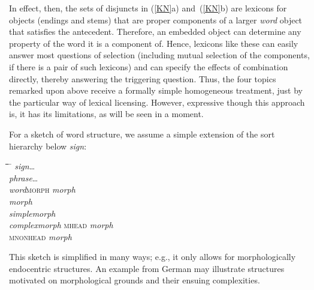 \documentclass[output=paper]{langsci/langscibook}
\begin{document}
In effect, then, the sets of disjuncts in (\ref{KN}a) and~(\ref{KN}b) are
lexicons for objects (endings and stems) that are proper components of a
larger \textit{word}\/ object that satisfies the antecedent. Therefore, an
embedded object can determine any property of the word it is a component
of. Hence, lexicons like these can easily answer most questions of
selection (including mutual selection of the components, if there is a pair
of such lexicons) and can specify the effects of combination directly,
thereby answering the triggering question. Thus, the four topics remarked
upon above receive a formally simple homogeneous treatment, just by the
particular way of lexical licensing.  
However, expressive though this
approach is, it has its limitations, as will be seen in a moment.

For a sketch of word structure, we assume a simple extension of the sort
hierarchy below \textit{sign}\/:
%
\begin{exe}
\ex
\label{mstruc}
\begin{tabbing}
\hspace{1,5em}\=\hspace{1,5em}\=\hspace{1,5em}\=\hspace{1,5em}\=\hspace{6em}
\=\kill
\textit{sign}\>\>\>\>\>\ldots\\
\>\textit{phrase}\>\>\>\>\ldots\\
\>\textit{word}\>\>\>\>\textsc{morph} \textit{morph}\\
\>\textit{morph}\\
\>\>\textit{simplemorph}\\
\>\>\textit{complexmorph}  \>\>\>\textsc{mhead} \textit{morph}\\
\>\>\>\>\>\textsc{mnonhead} \textit{morph}
\end{tabbing}
\end{exe}
%
This sketch is 
simplified in many ways; e.g., it only allows for
morphologically endocentric structures. An example from German
may illustrate structures motivated on morphological grounds
and their
ensuing complexities.
\end{document}
